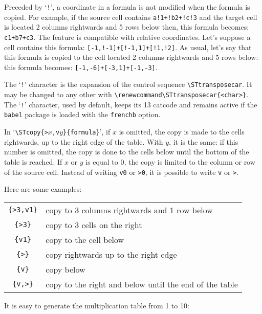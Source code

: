 \documentclass[a4paper,10pt]{article}
\newcommand\verbinline[1][]{\lstinline[breaklines=false,basicstyle=\normalsize\ttfamily,#1]}
\begin{document}
\begin{<table environment>}
Preceded by `\verb-!-', a coordinate in a formula is not modified when the formula is copied. For example, if the source cell contains \verb-a!1+!b2+!c!3- and the target cell is located 2 columns rightwards and 5 rows below then, this formula becomes: \verb-c1+b7+c3-. The feature is compatible with relative coordinates. Let's suppose a cell contains this formula: \verb|[-1,!-1]+[!-1,1]+[!1,!2]|. As usual, let's say that this formula is copied to the cell located  2 columns rightwards and 5 rows below: this formula becomes: \verb|[-1,-6]+[-3,1]+[-1,-3]|.

The `\verb-!-' character is the expansion of the control sequence \verbinline-\STtransposecar-. It may be changed to any other with \verbinline-\renewcommand\STtransposecar-\verb-{<char>}-. The `\verb-!-' character, used by default, keeps its 13 catcode and remains active if the \verb-babel- package is loaded with the \verb-frenchb- option.

In `\verbinline-\STcopy{>-$x$\verbinline-,v-$y$\verbinline-}{formula}-', if $x$ is omitted, the copy is made to the cells rightwards, up to the right edge of the table. With $y$, it is the same: if this number is omitted, the copy is done to the cells below until the bottom of the table is reached. If $x$ or $y$ is equal to 0, the copy is limited to the column or row of the source cell. Instead of writing \verb-v0- or \verb->0-, it is possible to write \verb-v- or \verb->-.

Here are some examples:
\begin{tabular}{cl}\hline
\verb-{>3,v1}- & copy to 3 columns rightwards and 1 row below\\
\verb-{>3}- & copy to 3 cells on the right\\
\verb-{v1}- & copy to the cell below\\
\verb-{>}- & copy rightwards up to the right edge\\
\verb-{v}- & copy below\\
\verb-{v,>}- & copy to the right and below until the end of the table\\\hline
\end{tabular}

It is easy to generate the multiplication table from 1 to 10:


\end{<table environment>}
\end{document}

